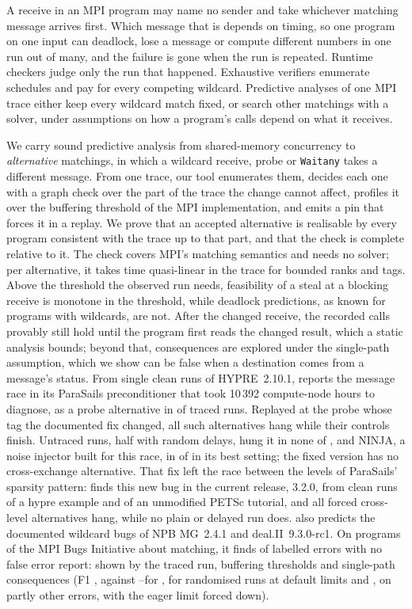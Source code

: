 A receive in an MPI program may name no sender and take whichever matching message
arrives first. Which message that is depends on timing, so one program on one input can
deadlock, lose a message or compute different numbers in one run out of many, and the
failure is gone when the run is repeated. Runtime checkers judge only the run that
happened. Exhaustive verifiers enumerate schedules and pay for every competing wildcard.
Predictive analyses of one MPI trace either keep every wildcard match fixed, or search other
matchings with a solver, under assumptions on how a program's calls depend on what it
receives.

We carry sound predictive analysis from shared-memory concurrency to \emph{alternative}
matchings, in which a wildcard receive, probe or \texttt{Waitany} takes a different message.
From one trace, our tool \tool enumerates them, decides each one with a graph check over the
part of the trace the change cannot affect, profiles it over the buffering threshold of the
MPI implementation, and emits a pin that forces it in a replay. We prove that an accepted
alternative is realisable by every program consistent with the trace up to that part, and
that the check is complete relative to it. The check covers MPI's matching semantics and
needs no solver; per alternative, it takes time quasi-linear in the trace for bounded ranks
and tags. Above the threshold the observed run needs, feasibility of a steal at a blocking
receive is monotone in the threshold, while deadlock predictions, as known for programs with
wildcards, are not. After the changed receive, the recorded calls provably still hold until
the program first reads the changed result, which a static analysis bounds; beyond that,
consequences are explored under the single-path assumption, which we show can be false when a
destination comes from a message's status.
From single clean runs of HYPRE~2.10.1, \tool reports the message race in its ParaSails
preconditioner that took 10\,392 compute-node hours to diagnose, as a probe alternative in
\nHypreExposed of \nHypreTraced traced runs. Replayed at the probe whose tag the documented fix
changed, all \nHypreCrossAlts such alternatives hang while their controls finish. Untraced runs,
half with random delays, hung it in none of \nHypreStressRuns, and NINJA, a noise injector built for this race,
in \nNinjaHypreEightAppHangSetup of \nNinjaHypreEightAppRuns in its best setting; the fixed version
has no cross-exchange alternative. That fix left the race between the levels of ParaSails' sparsity
pattern: \tool finds this new bug in the current release, 3.2.0, from clean runs of a hypre example
and of an unmodified PETSc tutorial, and all \nHypreNewAllCrossAlts forced cross-level alternatives
hang, while no plain or delayed run does. \tool also predicts the documented wildcard bugs of NPB MG~2.4.1 and deal.II~9.3.0-rc1. On \nMBIprogs
programs of the MPI Bugs Initiative about matching, it finds \nMBItpunion of \nMBIerrors
labelled errors with no false error report: \nMBItpobserved shown by the traced run,
\nMBItpPredBuf buffering thresholds and \nMBItpPredSP single-path consequences (F1
\MBIfoneunion, against \MBIfoneMUST--\MBIfoneMUSTsym for \MUST, \MBIfonestress for randomised runs at default
limits and \MBIfonestresseager, on partly other errors, with the eager limit forced down).
